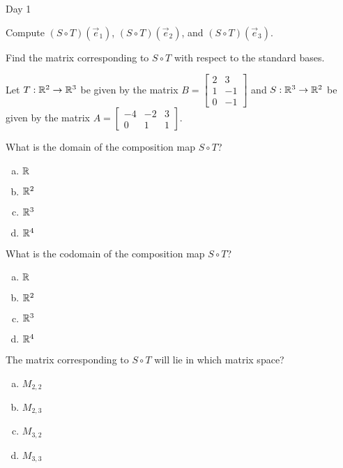 \begin{applicationActivities}{Day 1}
\begin{activity}{0}
Compute $(S \circ T)(\vec{e}_1)$, $(S \circ T)(\vec{e}_2)$, and
$(S \circ T)(\vec{e}_3)$.
\end{activity}

\begin{activity}{0}
Find the matrix corresponding to $S \circ T$ with respect to the standard bases.
\end{activity}

\begin{activity}{0}
Let $T: \mathbb{R}^2 \rightarrow \mathbb{R}^3$ be given by the matrix $B=\begin{bmatrix} 2 & 3 \\ 1 & -1 \\ 0 & -1 \end{bmatrix}$ and $S: \mathbb{R}^3 \rightarrow \mathbb{R}^2$ be given by the matrix $A=\begin{bmatrix} -4 & -2 & 3 \\ 0 & 1 & 1 \end{bmatrix}$.

What is the domain of the composition map $S \circ T$?
\begin{enumerate}[(a)]
\item $\mathbb{R}$
\item $\mathbb{R}^2$
\item $\mathbb{R}^3$
\item $\mathbb{R}^4$
\end{enumerate}
\end{activity}

\begin{activity}{0}
What is the codomain of the composition map $S \circ T$?
\begin{enumerate}[(a)]
\item $\mathbb{R}$
\item $\mathbb{R}^2$
\item $\mathbb{R}^3$
\item $\mathbb{R}^4$
\end{enumerate}
\end{activity}

\begin{activity}{0}
The matrix corresponding to $S \circ T$ will lie in which matrix space?
\begin{enumerate}[(a)]
\item $M_{2,2}$
\item $M_{2,3}$
\item $M_{3,2}$
\item $M_{3,3}$
\end{enumerate}
\end{activity}


\end{applicationActivities}
